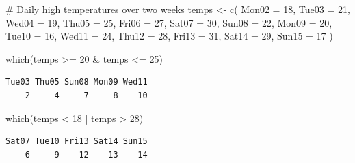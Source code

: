 \documentclass[
  letterpaper,
  DIV=11,
  numbers=noendperiod]{scrreprt}
\newenvironment{Shaded}{\begin{snugshade}}{\end{snugshade}}
\newcommand{\AttributeTok}[1]{\textcolor[rgb]{0.40,0.45,0.13}{#1}}
\newcommand{\CommentTok}[1]{\textcolor[rgb]{0.37,0.37,0.37}{#1}}
\newcommand{\DecValTok}[1]{\textcolor[rgb]{0.68,0.00,0.00}{#1}}
\newcommand{\FunctionTok}[1]{\textcolor[rgb]{0.28,0.35,0.67}{#1}}
\newcommand{\NormalTok}[1]{\textcolor[rgb]{0.00,0.23,0.31}{#1}}
\newcommand{\OtherTok}[1]{\textcolor[rgb]{0.00,0.23,0.31}{#1}}
\newcommand{\SpecialCharTok}[1]{\textcolor[rgb]{0.37,0.37,0.37}{#1}}
\begin{document}
\begin{Shaded}
\begin{Highlighting}[]
\CommentTok{\# Daily high temperatures over two weeks}
\NormalTok{temps }\OtherTok{\textless{}{-}} \FunctionTok{c}\NormalTok{(}
  \AttributeTok{Mon02 =} \DecValTok{18}\NormalTok{, }\AttributeTok{Tue03 =} \DecValTok{21}\NormalTok{, }\AttributeTok{Wed04 =} \DecValTok{19}\NormalTok{, }\AttributeTok{Thu05 =} \DecValTok{25}\NormalTok{, }\AttributeTok{Fri06 =} \DecValTok{27}\NormalTok{, }\AttributeTok{Sat07 =} \DecValTok{30}\NormalTok{, }\AttributeTok{Sun08 =} \DecValTok{22}\NormalTok{, }
  \AttributeTok{Mon09 =} \DecValTok{20}\NormalTok{, }\AttributeTok{Tue10 =} \DecValTok{16}\NormalTok{, }\AttributeTok{Wed11 =} \DecValTok{24}\NormalTok{, }\AttributeTok{Thu12 =} \DecValTok{28}\NormalTok{, }\AttributeTok{Fri13 =} \DecValTok{31}\NormalTok{, }\AttributeTok{Sat14 =} \DecValTok{29}\NormalTok{, }\AttributeTok{Sun15 =} \DecValTok{17}
\NormalTok{)}
\end{Highlighting}
\end{Shaded}

\begin{tcolorbox}[enhanced jigsaw, colbacktitle=quarto-callout-tip-color!10!white, opacitybacktitle=0.6, breakable, left=2mm, leftrule=.75mm, toprule=.15mm, toptitle=1mm, bottomtitle=1mm, colframe=quarto-callout-tip-color-frame, opacityback=0, coltitle=black, arc=.35mm, titlerule=0mm, colback=white, bottomrule=.15mm, title=\textcolor{quarto-callout-tip-color}{\faLightbulb}\hspace{0.5em}{Answer}, rightrule=.15mm]

\begin{Shaded}
\begin{Highlighting}[]
\FunctionTok{which}\NormalTok{(temps }\SpecialCharTok{\textgreater{}=} \DecValTok{20} \SpecialCharTok{\&}\NormalTok{ temps }\SpecialCharTok{\textless{}=} \DecValTok{25}\NormalTok{)}
\end{Highlighting}
\end{Shaded}

\begin{verbatim}
Tue03 Thu05 Sun08 Mon09 Wed11 
    2     4     7     8    10 
\end{verbatim}

\begin{Shaded}
\begin{Highlighting}[]
\FunctionTok{which}\NormalTok{(temps }\SpecialCharTok{\textless{}} \DecValTok{18} \SpecialCharTok{|}\NormalTok{ temps }\SpecialCharTok{\textgreater{}} \DecValTok{28}\NormalTok{)}
\end{Highlighting}
\end{Shaded}

\begin{verbatim}
Sat07 Tue10 Fri13 Sat14 Sun15 
    6     9    12    13    14 
\end{verbatim}

\end{tcolorbox}
\end{document}
